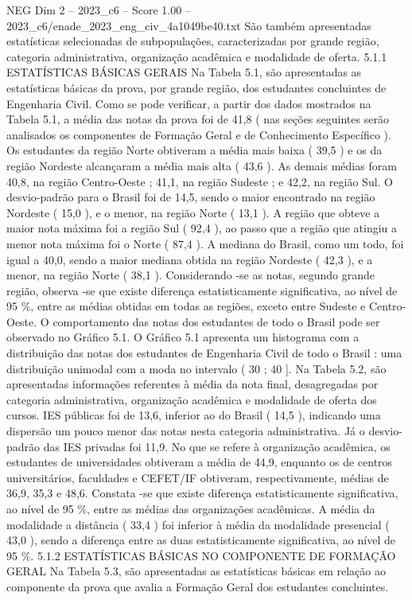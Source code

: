\begin{textsample}{NEG Dim 2 – 2023\_c6 – Score 1.00 – 2023\_c6/enade\_2023\_eng\_civ\_4a1049be40.txt}
São também apresentadas estatísticas selecionadas de subpopulações, caracterizadas por grande região, categoria administrativa, organização acadêmica e modalidade de oferta. 5.1.1 ESTATÍSTICAS BÁSICAS GERAIS Na Tabela 5.1, são apresentadas as estatísticas básicas da prova, por grande região, dos estudantes concluintes de Engenharia Civil.
Como se pode verificar, a partir dos dados mostrados na Tabela 5.1, a média das notas da prova foi de 41,8 ( nas seções seguintes serão analisados os componentes de Formação Geral e de Conhecimento Específico ).
Os estudantes da região Norte obtiveram a média mais baixa ( 39,5 ) e os da região Nordeste alcançaram a média mais alta ( 43,6 ).
As demais médias foram 40,8, na região Centro-Oeste ; 41,1, na região Sudeste ; e 42,2, na região Sul.
O desvio-padrão para o Brasil foi de 14,5, sendo o maior encontrado na região Nordeste ( 15,0 ), e o menor, na região Norte ( 13,1 ).
A região que obteve a maior nota máxima foi a região Sul ( 92,4 ), ao passo que a região que atingiu a menor nota máxima foi o Norte ( 87,4 ).
A mediana do Brasil, como um todo, foi igual a 40,0, sendo a maior mediana obtida na região Nordeste ( 42,3 ), e a menor, na região Norte ( 38,1 ).
Considerando -se as notas, segundo grande região, observa -se que existe diferença estatisticamente significativa, ao nível de 95 \%, entre as médias obtidas em todas as regiões, exceto entre Sudeste e Centro-Oeste.
O comportamento das notas dos estudantes de todo o Brasil pode ser observado no Gráfico 5.1.
O Gráfico 5.1 apresenta um histograma com a distribuição das notas dos estudantes de Engenharia Civil de todo o Brasil : uma distribuição unimodal com a moda no intervalo ( 30 ; 40 ].
Na Tabela 5.2, são apresentadas informações referentes à média da nota final, desagregadas por categoria administrativa, organização acadêmica e modalidade de oferta dos cursos.
IES públicas foi de 13,6, inferior ao do Brasil ( 14,5 ), indicando uma dispersão um pouco menor das notas nesta categoria administrativa.
Já o desvio-padrão das IES privadas foi 11,9.
No que se refere à organização acadêmica, os estudantes de universidades obtiveram a média de 44,9, enquanto os de centros universitários, faculdades e CEFET/IF obtiveram, respectivamente, médias de 36,9, 35,3 e 48,6.
Constata -se que existe diferença estatisticamente significativa, ao nível de 95 \%, entre as médias das organizações acadêmicas.
A média da modalidade a distância ( 33,4 ) foi inferior à média da modalidade presencial ( 43,0 ), sendo a diferença entre as duas estatisticamente significativa, ao nível de 95 \%. 5.1.2 ESTATÍSTICAS BÁSICAS NO COMPONENTE DE FORMAÇÃO GERAL Na Tabela 5.3, são apresentadas as estatísticas básicas em relação ao componente da prova que avalia a Formação Geral dos estudantes concluintes.

\end{textsample}
